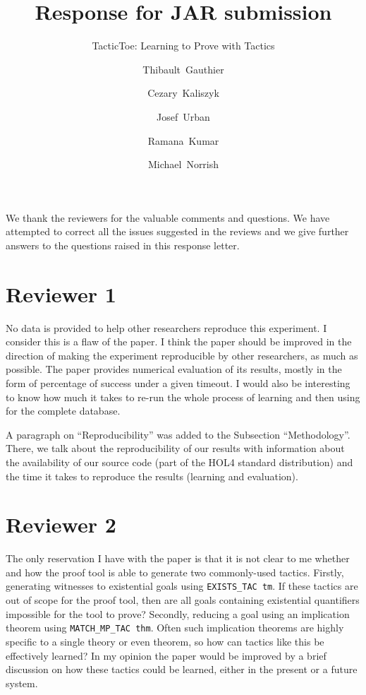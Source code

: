 \documentclass[]{scrartcl}
\title{Response for JAR submission}
\subtitle{TacticToe: Learning to Prove with Tactics}
\author{\mbox{Thibault Gauthier} \and \mbox{Cezary Kaliszyk} \and \mbox{Josef
		Urban} \and \mbox{Ramana Kumar} \and \mbox{Michael Norrish}}
\begin{document}
\maketitle

We thank the reviewers for the valuable comments and questions. We have 
attempted to correct all the issues suggested in the reviews and we give 
further answers to the questions raised in this response letter.

\section*{Reviewer 1}

\begin{leftbar}
No data is provided to help other researchers reproduce this experiment.  I 
consider this is a flaw of the paper.  I think the paper should be improved in 
the direction of making the experiment reproducible by other researchers, as 
much as possible. The paper provides numerical evaluation of its results, 
mostly in the form of 
percentage of success under a given timeout. I would also be interesting to 
know how much it takes to re-run the whole process of learning and then using 
for the complete database.
\end{leftbar}

A paragraph on ``Reproducibility'' was added to the Subsection ``Methodology''. 
There, 
we talk about the 
reproducibility of our results with information about the availability of our 
source code (part of the HOL4 standard distribution) and the 
time it takes to reproduce the results (learning and evaluation). 

\section*{Reviewer 2}

\begin{leftbar}
The only reservation I have with the paper is that it is not clear to me 
whether and how the proof tool is able to generate two commonly-used tactics. 
Firstly, generating witnesses to existential goals using \texttt{EXISTS\_TAC 
tm}. If these 
tactics are out of scope for the proof tool, then are all goals containing 
existential
quantifiers impossible for the tool to prove? Secondly, reducing a goal using 
an implication theorem using \texttt{MATCH\_MP\_TAC thm}. Often such 
implication theorems 
are
highly specific to a single theory or even theorem, so how can tactics like 
this be effectively learned? In my opinion the paper would be improved by a 
brief
discussion on how these tactics could be learned, either in the present or a 
future system.
\end{leftbar}
\end{document}
